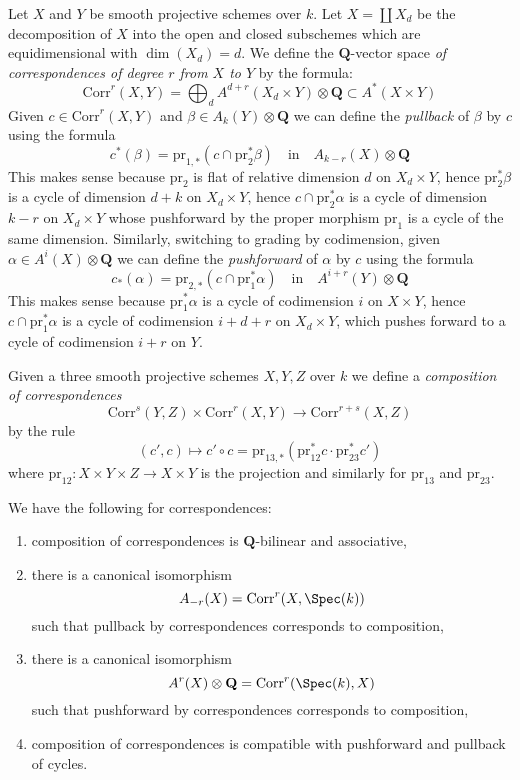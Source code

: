 \medskip\noindent
Let $X$ and $Y$ be smooth projective schemes over $k$.
Let $X = \coprod X_d$ be the decomposition of $X$ into
the open and closed subschemes which are equidimensional
with $\dim(X_d) = d$. We define the $\mathbf{Q}$-vector space
{\it of correspondences of degree $r$ from $X$ to $Y$}
by the formula:
$$
\text{Corr}^r(X, Y) =
\bigoplus\nolimits_d A^{d + r}(X_d \times Y) \otimes \mathbf{Q}
\subset
A^*(X \times Y)
$$
Given $c \in \text{Corr}^r(X, Y)$ and $\beta \in A_k(Y) \otimes \mathbf{Q}$
we can define the {\it pullback} of $\beta$ by $c$ using the formula
$$
c^*(\beta) = \text{pr}_{1, *}(c \cap \text{pr}_2^*\beta)
\quad\text{in}\quad
A_{k - r}(X) \otimes \mathbf{Q}
$$
This makes sense because $\text{pr}_2$ is flat of relative dimension
$d$ on $X_d \times Y$, hence $\text{pr}_2^*\beta$ is a cycle of
dimension $d + k$ on $X_d \times Y$, hence $c \cap \text{pr}_2^*\alpha$
is a cycle of dimension $k - r$ on $X_d \times Y$ whose pushforward
by the proper morphism $\text{pr}_1$ is a cycle of the same dimension.
Similarly, switching to grading by codimension,
given $\alpha \in A^i(X) \otimes \mathbf{Q}$ we can define the
{\it pushforward} of $\alpha$ by $c$ using the formula
$$
c_*(\alpha) = \text{pr}_{2, *}(c \cap \text{pr}_1^*\alpha)
\quad\text{in}\quad
A^{i + r}(Y) \otimes \mathbf{Q}
$$
This makes sense because $\text{pr}_1^*\alpha$ is a cycle of codimension
$i$ on $X \times Y$, hence $c \cap \text{pr}_1^*\alpha$ is a cycle
of codimension $i + d + r$ on $X_d \times Y$, which pushes forward
to a cycle of codimension $i + r$ on $Y$.

\medskip\noindent
Given a three smooth projective schemes $X, Y, Z$ over $k$ we define a
{\it composition of correspondences}
$$
\text{Corr}^s(Y, Z)
\times
\text{Corr}^r(X, Y)
\longrightarrow
\text{Corr}^{r + s}(X, Z)
$$
by the rule
$$
(c', c)
\longmapsto
c' \circ c =
\text{pr}_{13, *}(\text{pr}_{12}^*c \cdot \text{pr}_{23}^*c')
$$
where $\text{pr}_{12} : X \times Y \times Z \to X \times Y$
is the projection and similarly for $\text{pr}_{13}$ and $\text{pr}_{23}$.

\begin{lemma}
\label{lemma-composition-correspondences}
We have the following for correspondences:
\begin{enumerate}
\item composition of correspondences is $\mathbf{Q}$-bilinear
and associative,
\item there is a canonical isomorphism
$$
A_{-r}(X) = \text{Corr}^r(X, \Spec(k))
$$
such that pullback by correspondences corresponds to composition,
\item there is a canonical isomorphism
$$
A^r(X) \otimes \mathbf{Q} = \text{Corr}^r(\Spec(k), X)
$$
such that pushforward by correspondences corresponds to composition,
\item composition of correspondences is compatible with pushforward and
pullback of cycles.
\end{enumerate}
\end{lemma}

